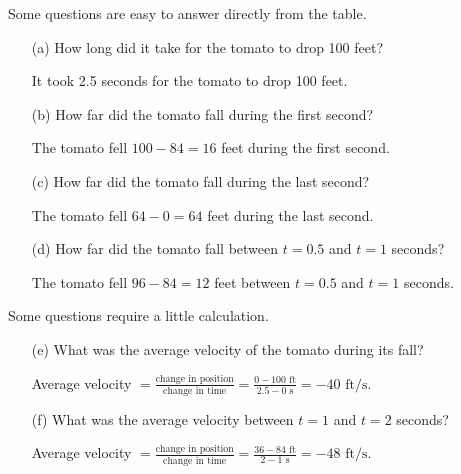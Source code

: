Some questions are easy to answer directly from the table.
\begin{example}
    \begin{itemize}
    \item[(a)] How long did it take for the tomato to drop 100 feet?

    \begin{solution}
    It took 2.5 seconds for the tomato to drop 100 feet.
    \end{solution}

    \item[(b)] How far did the tomato fall during the first second?

    \begin{solution}
    The tomato fell $100-84=16$ feet during the first second.
    \end{solution}

    \item[(c)] How far did the tomato fall during the last second?

    \begin{solution}
    The tomato fell $64-0=64$ feet during the last second.
    \end{solution}

    \item[(d)] How far did the tomato fall between $t=0.5$ and $t=1$ seconds? 

    \begin{solution}
    The tomato fell $96 - 84 = 12$ feet between $t=0.5$ and $t=1$ seconds.
    \end{solution}
    \end{itemize}
\end{example}
Some questions require a little calculation.
\begin{example}
    \begin{itemize}
    \item[(e)] What was the average velocity of the tomato during its fall?

    \begin{solution}
    Average velocity $= \frac{\mbox{change in position}}{\mbox{change in time}} = \frac{0-100 \mbox{ ft}}{2.5-0 \mbox{ s}} = -40 \mbox{ ft/s}$.
    \end{solution}

    \item[(f)] What was the average velocity between $t=1$ and $t=2$ seconds?

    \begin{solution}
    Average velocity $= \frac{\mbox{change in position}}{\mbox{change in time}} = \frac{36-84 \mbox{ ft}}{2-1 \mbox{ s}} = -48 \mbox{ ft/s}$.
    \end{solution}
    \end{itemize}
\end{example}

